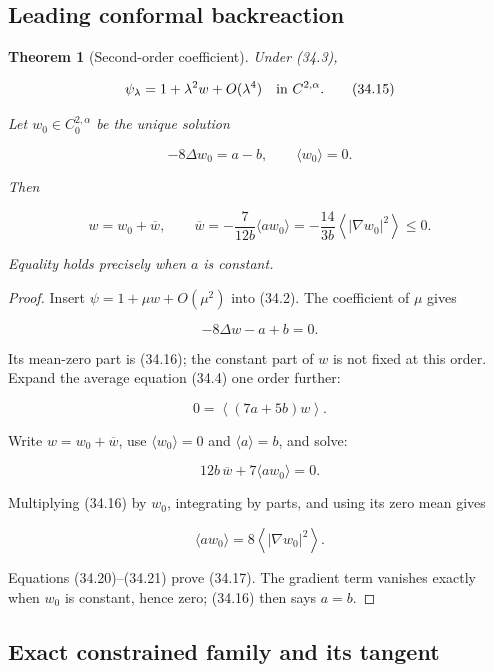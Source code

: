 \documentclass[11pt]{article}
\newtheorem{theorem}{Theorem}[section]
\theoremstyle{remark}
\begin{document}
\subsection{Leading conformal backreaction}

\begin{theorem}[Second-order coefficient]
\label{thm:v19v31-leading}
Under (34.3),

\[
 \psi_\lambda=1+\lambda^2w+O(\lambda^4)
 \quad\hbox{in }C^{2,\alpha}.                                \tag{34.15}
\]

Let \(w_0\in C^{2,\alpha}_0\) be the unique solution

\[
 -8\Delta w_0=a-b,\qquad \langle w_0\rangle=0.                \tag{34.16}
\]

Then

\[
 w=w_0+\overline w,\qquad
 \overline w
 =-\frac{7}{12b}\langle a w_0\rangle
 =-\frac{14}{3b}\left\langle|\nabla w_0|^2\right\rangle
 \leq0.                                                       \tag{34.17}
\]

Equality holds precisely when \(a\) is constant.
\end{theorem}

\begin{proof}
Insert \(\psi=1+\mu w+O(\mu^2)\) into (34.2).  The coefficient of
\(\mu\) gives

\[
 -8\Delta w-a+b=0.                                           \tag{34.18}
\]

Its mean-zero part is (34.16); the constant part of \(w\) is not fixed at
this order.  Expand the average equation (34.4) one order further:

\[
 0=\left\langle(7a+5b)w\right\rangle.                         \tag{34.19}
\]

Write \(w=w_0+\overline w\), use
\(\langle w_0\rangle=0\) and \(\langle a\rangle=b\), and solve:

\[
 12b\,\overline w+7\langle a w_0\rangle=0.                   \tag{34.20}
\]

Multiplying (34.16) by \(w_0\), integrating by parts, and using its zero
mean gives

\[
 \langle a w_0\rangle
 =8\left\langle|\nabla w_0|^2\right\rangle.                   \tag{34.21}
\]

Equations (34.20)--(34.21) prove (34.17).  The gradient term vanishes
exactly when \(w_0\) is constant, hence zero; (34.16) then says \(a=b\).
\end{proof}

\subsection{Exact constrained family and its tangent}
\end{document}
